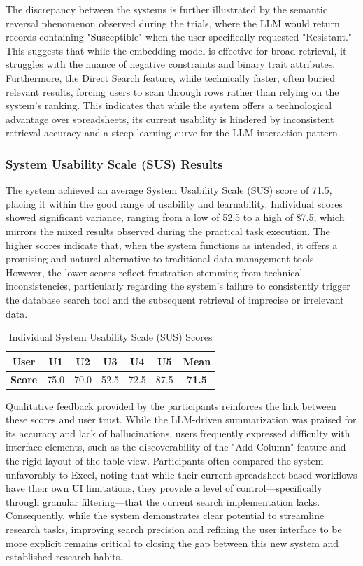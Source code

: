 \documentclass[journal]{./IEEE/IEEEtran}
\begin{document}
The discrepancy between the systems is further illustrated by the semantic reversal phenomenon observed during the trials, where the LLM would return records containing "Susceptible" when the user specifically requested "Resistant." This suggests that while the embedding model is effective for broad retrieval, it struggles with the nuance of negative constraints and binary trait attributes. Furthermore, the Direct Search feature, while technically faster, often buried relevant results, forcing users to scan through rows rather than relying on the system’s ranking. This indicates that while the system offers a technological advantage over spreadsheets, its current usability is hindered by inconsistent retrieval accuracy and a steep learning curve for the LLM interaction pattern.


\subsubsection{System Usability Scale (SUS) Results}
The system achieved an average System Usability Scale (SUS) score of 71.5, placing it within the good range of usability and learnability. Individual scores showed significant variance, ranging from a low of 52.5 to a high of 87.5, which mirrors the mixed results observed during the practical task execution. The higher scores indicate that, when the system functions as intended, it offers a promising and natural alternative to traditional data management tools. However, the lower scores reflect frustration stemming from technical inconsistencies, particularly regarding the system's failure to consistently trigger the database search tool and the subsequent retrieval of imprecise or irrelevant data.


\begin{table}[htbp]
\caption{Individual System Usability Scale (SUS) Scores}
\label{tab:sus_scores}
\centering
\begin{tabular}{c|ccccc|c}
\hline
\textbf{User} & U1 & U2 & U3 & U4 & U5 & \textbf{Mean} \\ \hline
\textbf{Score} & 75.0 & 70.0 & 52.5 & 72.5 & 87.5 & \textbf{71.5} \\ \hline
\end{tabular}
\end{table}


Qualitative feedback provided by the participants reinforces the link between these scores and user trust. While the LLM-driven summarization was praised for its accuracy and lack of hallucinations, users frequently expressed difficulty with interface elements, such as the discoverability of the "Add Column" feature and the rigid layout of the table view. Participants often compared the system unfavorably to Excel, noting that while their current spreadsheet-based workflows have their own UI limitations, they provide a level of control—specifically through granular filtering—that the current search implementation lacks. Consequently, while the system demonstrates clear potential to streamline research tasks, improving search precision and refining the user interface to be more explicit remains critical to closing the gap between this new system and established research habits.
\end{document}
